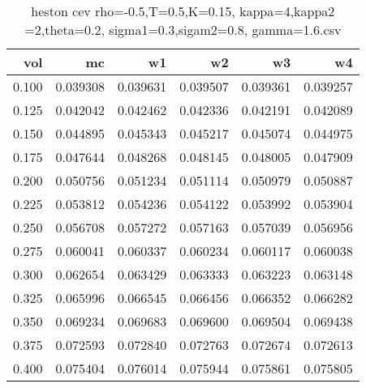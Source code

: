 \begin{table}
  \centering
  \caption{heston cev rho=-0.5,T=0.5,K=0.15, kappa=4,kappa2 =2,theta=0.2, sigma1=0.3,sigam2=0.8, gamma=1.6.csv}
  \begin{tabular}{rrrrrr}
  \toprule
    vol &       mc &       w1 &       w2 &       w3 &       w4 \\
  \midrule
  0.100 & 0.039308 & 0.039631 & 0.039507 & 0.039361 & 0.039257 \\
  0.125 & 0.042042 & 0.042462 & 0.042336 & 0.042191 & 0.042089 \\
  0.150 & 0.044895 & 0.045343 & 0.045217 & 0.045074 & 0.044975 \\
  0.175 & 0.047644 & 0.048268 & 0.048145 & 0.048005 & 0.047909 \\
  0.200 & 0.050756 & 0.051234 & 0.051114 & 0.050979 & 0.050887 \\
  0.225 & 0.053812 & 0.054236 & 0.054122 & 0.053992 & 0.053904 \\
  0.250 & 0.056708 & 0.057272 & 0.057163 & 0.057039 & 0.056956 \\
  0.275 & 0.060041 & 0.060337 & 0.060234 & 0.060117 & 0.060038 \\
  0.300 & 0.062654 & 0.063429 & 0.063333 & 0.063223 & 0.063148 \\
  0.325 & 0.065996 & 0.066545 & 0.066456 & 0.066352 & 0.066282 \\
  0.350 & 0.069234 & 0.069683 & 0.069600 & 0.069504 & 0.069438 \\
  0.375 & 0.072593 & 0.072840 & 0.072763 & 0.072674 & 0.072613 \\
  0.400 & 0.075404 & 0.076014 & 0.075944 & 0.075861 & 0.075805 \\
  \bottomrule
  \end{tabular}
  \end{table}

